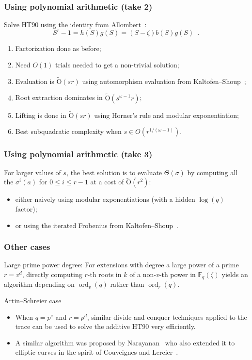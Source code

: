 \documentclass[francais]{beamer}
\def\F {\ensuremath{\mathbb{F}}}
\def\tildO {\ensuremath{\mathrm{\tilde{O}}}}
\DeclareMathOperator{\ord}{ord}
\begin{document}
\begin{frame}\frametitle{Using polynomial arithmetic (take 2)}
  Solve HT90 using the identity from Allombert~\cite{Allombert02-rev}:
  \[
    S^r-1 = h(S) g(S) = (S-\zeta) b(S) g(S) \enspace .
  \]

  \begin{enumerate}
  \item Factorization done as before;
  \item Need $O(1)$ trials needed to get a non-trivial solution;
  \item Evaluation is $\tildO(s r)$
    using automorphism evaluation from Kaltofen--Shoup~\cite{kaltofen+shoup97};
  \item Root extraction dominates in $\tildO(s^{\omega-1}r)$;
  \item Lifting is done in $\tildO(s r)$ using Horner's rule and modular exponentiation;
  \item Best subquadratic complexity when $s \in O(r^{1/(\omega-1)})$.
  \end{enumerate}
\end{frame}

\begin{frame}\frametitle{Using polynomial arithmetic (take 3)}
  For larger values of $s$, the best solution is
  to evaluate $\Theta(\sigma)$ by computing all the $\sigma^i(a)$
  for $0 \leq i \leq r-1$ at a cost of $\tildO(r^2)$:
  \begin{itemize}
  \item either naively using modular exponentiations (with a hidden $\log(q)$ factor);
  \item or using the iterated Frobenius from Kaltofen--Shoup~\cite{kaltofen+shoup97}.
  \end{itemize}
\end{frame}

\begin{frame}\frametitle{Other cases}
  \begin{block}{Large prime power degree:}
  For extensions with degree a large power of a prime $r = v^d$,
  directly computing $r$-th roots in $k$ of a non-$v$-th power in $\F_q(\zeta)$
  yields an algorithm depending on $\ord_v(q)$ rather than $\ord_r(q)$.
\end{block}
\vfill
\begin{block}{Artin--Schreier case}
  \begin{itemize}
  \item When $q = p^e$ and $r = p^d$,
  similar divide-and-conquer techniques applied to the trace
  can be used to solve the additive HT90 very efficiently.
\item A similar algorithm was proposed by Narayanan~\cite{narayanan2016fast}
  who also extended it to elliptic curves in the spirit of Couveignes and Lercier~\cite{CL08}.
\end{itemize}
\end{block}
\end{frame}
\end{document}
